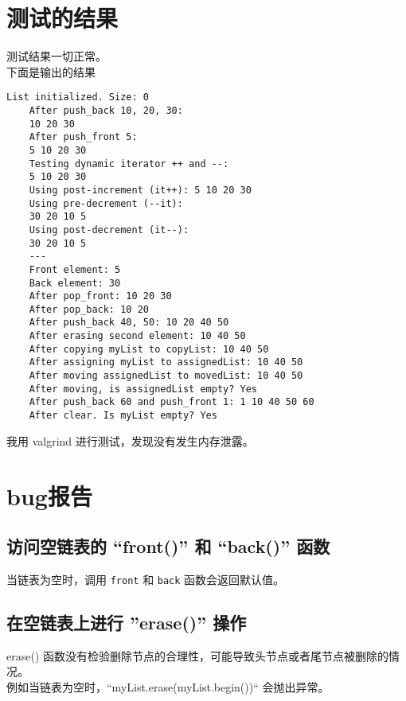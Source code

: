 \documentclass[UTF8]{ctexart}
\begin{document}
\section{测试的结果}

测试结果一切正常。\\
下面是输出的结果
\begin{lstlisting}[language={}, caption={List.cpp的输出结果}]
    List initialized. Size: 0
    After push_back 10, 20, 30:
    10 20 30
    After push_front 5:
    5 10 20 30
    Testing dynamic iterator ++ and --:
    5 10 20 30
    Using post-increment (it++): 5 10 20 30
    Using pre-decrement (--it):
    30 20 10 5
    Using post-decrement (it--):
    30 20 10 5
    ---
    Front element: 5
    Back element: 30
    After pop_front: 10 20 30
    After pop_back: 10 20
    After push_back 40, 50: 10 20 40 50
    After erasing second element: 10 40 50
    After copying myList to copyList: 10 40 50
    After assigning myList to assignedList: 10 40 50
    After moving assignedList to movedList: 10 40 50
    After moving, is assignedList empty? Yes
    After push_back 60 and push_front 1: 1 10 40 50 60
    After clear. Is myList empty? Yes
\end{lstlisting}

我用 valgrind 进行测试，发现没有发生内存泄露。

\section{bug报告}

\subsection*{访问空链表的 ``front()'' 和 ``back()'' 函数}
当链表为空时，调用 \texttt{front} 和 \texttt{back} 函数会返回默认值。

\subsection*{在空链表上进行 ''erase()'' 操作}
erase() 函数没有检验删除节点的合理性，可能导致头节点或者尾节点被删除的情况。\\
例如当链表为空时，``myList.erase(myList.begin())`` 会抛出异常。
\end{document}
